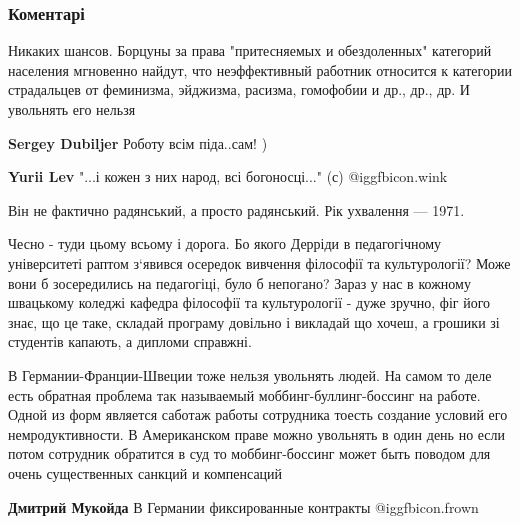  
 
 
 
 
\subsubsection{Коментарі}

\begin{itemize} %
Никаких шансов. Борцуны за права "притесняемых и обездоленных" категорий
населения мгновенно найдут, что неэффективный работник относится к категории
страдальцев от феминизма, эйджизма, расизма, гомофобии и др., др., др. И
увольнять его нельзя

\begin{itemize} %
\textbf{Sergey Dubiljer} Роботу всім піда..сам! )

\textbf{Yurii Lev} "...і кожен з них народ, всі богоносці..." (с)  @igg{fbicon.wink} 
\end{itemize} %

Він не фактично радянський, а просто радянський. Рік ухвалення — 1971.


Чесно - туди цьому всьому і дорога. Бо якого Дерріди в педагогічному
університеті раптом з‘явився осередок вивчення філософії та культурології? Може
вони б зосередились на педагогіці, було б непогано? Зараз у нас в кожному
швацькому коледжі кафедра філософії та культурології - дуже зручно, фіг його
знає, що це таке, складай програму довільно і викладай що хочеш, а грошики зі
студентів капають, а дипломи справжні.



В Германии-Франции-Швеции тоже нельзя увольнять людей. На самом то деле есть
обратная проблема так называемый моббинг-буллинг-боссинг на работе. Одной из
форм является саботаж работы сотрудника тоесть создание условий его
немродуктивности. В Американском праве можно увольнять в один день но если
потом сотрудник обратится в суд то моббинг-боссинг может быть поводом для очень
существенных санкций и компенсаций

\begin{itemize} %
\textbf{Дмитрий Мукойда} В Германии фиксированные контракты  @igg{fbicon.frown} 


\end{itemize}
\end{itemize}
